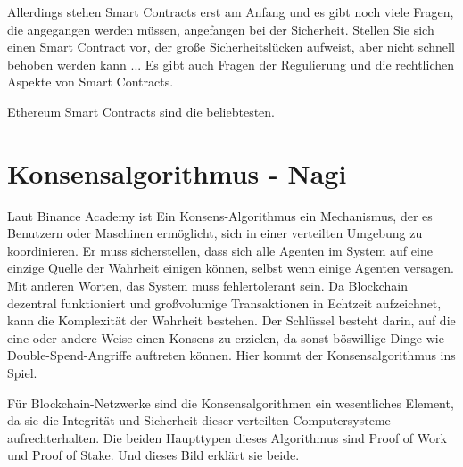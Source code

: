 Allerdings stehen Smart Contracts erst am Anfang und es gibt noch viele Fragen, die angegangen werden müssen, angefangen bei der Sicherheit. Stellen Sie sich einen Smart Contract vor, der große Sicherheitslücken aufweist, aber nicht schnell behoben werden kann ... Es gibt auch Fragen der Regulierung und die rechtlichen Aspekte von Smart Contracts.

Ethereum Smart Contracts sind die beliebtesten.

\section{Konsensalgorithmus - Nagi}

Laut Binance Academy ist Ein Konsens-Algorithmus ein Mechanismus, der es Benutzern oder Maschinen ermöglicht, sich in einer verteilten Umgebung zu koordinieren. Er muss sicherstellen, dass sich alle Agenten im System auf eine einzige Quelle der Wahrheit einigen können, selbst wenn einige Agenten versagen. Mit anderen Worten, das System muss fehlertolerant sein. \cite{Binance21}
\newline
Da Blockchain dezentral funktioniert und großvolumige Transaktionen in Echtzeit aufzeichnet, kann die Komplexität der Wahrheit bestehen. Der Schlüssel besteht darin, auf die eine oder andere Weise einen Konsens zu erzielen, da sonst böswillige Dinge wie Double-Spend-Angriffe auftreten können. Hier kommt der Konsensalgorithmus ins Spiel.


Für Blockchain-Netzwerke sind die Konsensalgorithmen ein wesentliches Element, da sie die Integrität und Sicherheit dieser verteilten Computersysteme aufrechterhalten. Die beiden Haupttypen dieses Algorithmus sind Proof of Work und Proof of Stake. Und dieses Bild erklärt sie beide.

